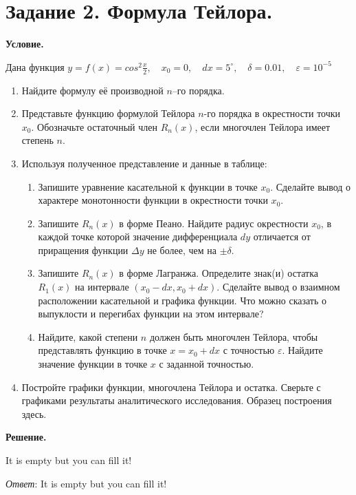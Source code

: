 \section{Задание 2. Формула Тейлора.}

\textbf{Условие.}

Дана функция $\displaystyle y = f(x) = cos^2 \frac{x}{2}, \quad x_0 = 0, \quad dx = 5^\circ, \quad \delta = 0.01, \quad \varepsilon = 10^{-5}$\\
\begin{enumerate}
    \item Найдите формулу её производной $n$–го порядка.
    \item Представьте функцию формулой Тейлора $n$-го порядка в окрестности точки $x_0$. Обозначьте остаточный член $R_n(x)$, если многочлен Тейлора имеет степень $n$.
    \item Используя полученное представление и данные в таблице:
    \begin{enumerate}
        \item Запишите уравнение касательной к функции в точке $x_0$. Сделайте вывод о характере монотонности функции в окрестности точки $x_0$.
        \item Запишите $R_n(x)$ в форме Пеано. Найдите радиус окрестности $x_0$, в каждой
точке которой значение дифференциала $dy$ отличается от приращения функции
$\Delta y$ не более, чем на $\pm \delta$.
        \item Запишите $R_n(x)$ в форме Лагранжа. Определите знак(и) остатка $R_1(x)$ на
интервале $(x_0 - dx, x_0 + dx)$. Сделайте вывод о взаимном расположении
касательной и графика функции. Что можно сказать о выпуклости и перегибах
функции на этом интервале?
        \item Найдите, какой степени $n$ должен быть многочлен Тейлора, чтобы представлять
функцию в точке $x = x_0 + dx$ с точностью $\varepsilon$. Найдите значение функции в
точке $x$ с заданной точностью.
    \end{enumerate}
    \item Постройте графики функции, многочлена Тейлора и остатка. Сверьте с графиками
результаты аналитического исследования. Образец построения здесь.
\end{enumerate}
\vspace{10mm}
\textbf{Решение.}

It is empty but you can fill it!

\textit{Ответ}:  It is empty but you can fill it!
\clearpage